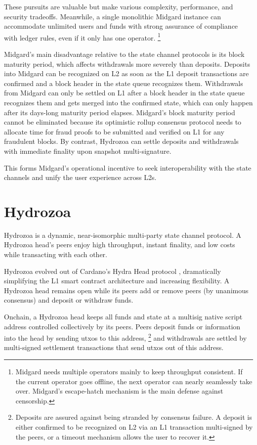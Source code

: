 \documentclass[11pt,a4paper,oneside]{article}
\begin{document}
\begin{multicols}{2}
These pursuits are valuable but make various complexity, performance, and security tradeoffs.
Meanwhile, a single monolithic Midgard instance can accommodate unlimited users and funds with strong assurance of compliance with ledger rules, even if it only has one operator.%
\footnote{Midgard needs multiple operators mainly to keep throughput consistent.
If the current operator goes offline, the next operator can nearly seamlessly take over.
Midgard's escape-hatch mechanism is the main defense against censorship.}

Midgard's main disadvantage relative to the state channel protocols is its block maturity period, which affects withdrawals more severely than deposits.
Deposits into Midgard can be recognized on L2 as soon as the L1 deposit transactions are confirmed and a block header in the state queue recognizes them.
Withdrawals from Midgard can only be settled on L1 after a block header in the state queue recognizes them and gets merged into the confirmed state, which can only happen after its days-long maturity period elapses.
Midgard's block maturity period cannot be eliminated because its optimistic rollup consensus protocol needs to allocate time for fraud proofs to be submitted and verified on L1 for any fraudulent blocks.
By contrast, Hydrozoa can settle deposits and withdrawals with immediate finality upon snapshot multi-signature.

This forms Midgard's operational incentive to seek interoperability with the state channels and unify the user experience across L2s.

\section{Hydrozoa}%
\label{h:hydrozoa}

Hydrozoa \citep{FlerovskyHydrozoaProtocolLightweight2024} is a dynamic, near-isomorphic multi-party state channel protocol.
A Hydrozoa head's peers enjoy high throughput, instant finality, and low costs while transacting with each other.

Hydrozoa evolved out of Cardano's Hydra Head protocol \citep{NagelEtAlHydraHeadV1Specification2024}, dramatically simplifying the L1 smart contract architecture and increasing flexibility.
A Hydrozoa head remains open while its peers add or remove peers (by unanimous consensus) and deposit or withdraw funds.

Onchain, a Hydrozoa head keeps all funds and state at a multisig native script address controlled collectively by its peers.
Peers deposit funds or information into the head by sending utxos to this address,%
\footnote{Deposits are assured against being stranded by consensus failure.
A deposit is either confirmed to be recognized on L2 via an L1 transaction multi-signed by the peers, or a timeout mechanism allows the user to recover it.}
and withdrawals are settled by multi-signed settlement transactions that send utxos out of this address.


\end{multicols}
\end{document}
